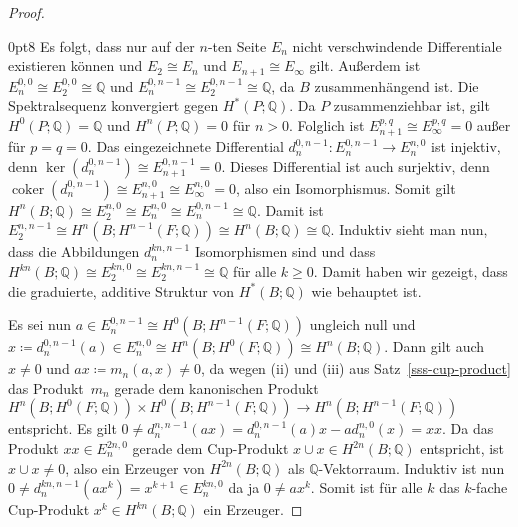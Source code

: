 \documentclass[11pt, a4paper, german]{article}
\theoremstyle{definition}
\theoremstyle{remark}
\newcommand{\Q}{\mathbb{Q}} %
\DeclareMathOperator{\coker}{coker} %
\begin{document}
\begin{proof}
\begin{cutout}{0}{\dimexpr\linewidth-8cm\relax}{0pt}{8}
    Es folgt, dass nur auf der $n$-ten Seite $E_n$ nicht verschwindende Differentiale existieren können und $E_2 \cong E_n$ und $E_{n+1} \cong E_\infty$ gilt.
    Außerdem ist $E_n^{0,0} \cong E_2^{0,0} \cong \Q$ und $E_n^{0,n-1} \cong E_2^{0,n-1} \cong \Q$, da $B$ zusammenhängend ist.
    Die Spektralsequenz konvergiert gegen $H^*(P; \Q)$.
    Da $P$ zusammenziehbar ist, gilt $H^0(P; \Q) = \Q$ und $H^n(P; \Q) = 0$ für $n > 0$.
    Folglich ist $E_{n+1}^{p,q} \cong E_\infty^{p,q} = 0$ außer für $p = q = 0$.
    Das eingezeichnete Differential $d_n^{0,n-1} : E_n^{0,n-1} \to E_n^{n,0}$ ist injektiv, denn $\ker(d_n^{0,n-1}) \cong E_{n+1}^{0,n-1} = 0$.
    Dieses Differential ist auch surjektiv, denn $\coker(d_n^{0,n-1}) \cong E_{n+1}^{n,0} \cong E_\infty^{n,0} = 0$, also ein Isomorphismus.
    Somit gilt $H^n(B; \Q) \cong E_2^{n,0} \cong E_n^{n,0} \cong E_n^{0,n-1} \cong \Q$.
    Damit ist $E_2^{n,n-1} \cong H^{n}(B; H^{n-1}(F; \Q)) \cong H^{n}(B; \Q) \cong \Q$.
    Induktiv sieht man nun, dass die Abbildungen $d_n^{kn,n-1}$ Isomorphismen sind und dass $H^{kn}(B; \Q) \cong E_2^{kn,0} \cong  E_2^{kn,n-1} \cong \Q$ für alle $k \geq 0$.
    Damit haben wir gezeigt, dass die graduierte, additive Struktur von $H^*(B; \Q)$ wie behauptet ist.
  \end{cutout}
  Es sei nun $a \in E_n^{0,n-1} \cong H^0(B; H^{n-1}(F; \Q))$ ungleich null und $x \coloneqq d_n^{0,n-1}(a) \in E_n^{n,0} \cong H^n(B; H^0(F; \Q)) \cong H^n(B; \Q)$.
  Dann gilt auch $x \neq 0$ und $ax \coloneqq m_n(a, x) \neq 0$, da wegen (ii) und (iii) aus Satz~\ref{sss-cup-product} das Produkt~$m_n$ gerade dem kanonischen Produkt $H^n(B; H^0(F; \Q)) \times H^0(B; H^{n-1}(F; \Q)) \to H^n(B; H^{n-1}(F; \Q))$ entspricht.
  Es gilt
  $0 \neq d_n^{n,n-1}(ax) = d_n^{0,n-1}(a)x - a d_n^{n,0}(x) = xx$.
  Da das Produkt $xx \in E_n^{2n,0}$ gerade dem Cup-Produkt $x \cup x \in H^{2n}(B; \Q)$ entspricht, ist $x \cup x \neq 0$, also ein Erzeuger von $H^{2n}(B; \Q)$ als $\Q$-Vektorraum.
  Induktiv ist nun $0 \neq d_n^{kn,n-1}(a x^k) = x^{k+1} \in E_n^{kn,0}$ da ja $0 \neq a x^k$.
  Somit ist für alle $k$ das $k$-fache Cup-Produkt $x^k \in H^{kn}(B; \Q)$ ein Erzeuger.

  \vspace{1.5cm}


\end{proof}
\end{document}
